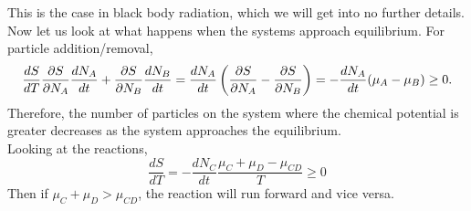     This is the case in black body radiation, which we will get into no further details. 
    Now let us look at what happens when the systems approach equilibrium. For particle addition/removal,
    \begin{equation}
        \frac{d S}{d T} \frac{\partial S}{\partial N_A}\frac{d N_A}{d t}+\frac{\partial S}{\partial N_B}\frac{d N_B}{d t}=\frac{d N_A}{d t}\left( \frac{\partial S}{\partial N_A}-\frac{\partial S}{\partial N_B} \right)=-\frac{d N_A}{d t}(\mu_A-\mu_B)\geq 0.
    \end{equation}
    Therefore, the number of particles on the system where the chemical potential is greater decreases as the system approaches the equilibrium. \\
    Looking at the reactions, 
    \begin{equation}
        \frac{d S}{d T} = -\frac{d N_C}{d t}\frac{\mu_C+\mu_D-\mu_{CD}}{T}\geq0
    \end{equation}
    Then if $\mu_C+\mu_D>\mu_{CD}$, the reaction will run forward and vice versa. 

